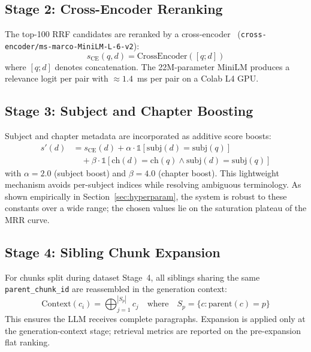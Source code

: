 \documentclass[conference]{IEEEtran}
\begin{document}
\subsection{Stage 2: Cross-Encoder Reranking}
The top-100 RRF candidates are reranked by a cross-encoder~\cite{nogueira2019bert} (\texttt{cross-encoder/ms-marco-MiniLM-L-6-v2}):
\begin{equation}
\label{eq:ce}
s_{\mathrm{CE}}(q,d) = \mathrm{CrossEncoder}([q;d])
\end{equation}
where $[q;d]$ denotes concatenation. The 22M-parameter MiniLM produces a relevance logit per pair with ${\approx}1.4$~ms per pair on a Colab L4 GPU.

\subsection{Stage 3: Subject and Chapter Boosting}
Subject and chapter metadata are incorporated as additive score boosts:
\begin{equation}
\label{eq:boost}
\begin{split}
s'(d) &= s_{\mathrm{CE}}(d) + \alpha \cdot \mathbb{1}\!\left[\mathrm{subj}(d) = \mathrm{subj}(q)\right] \\
      &\quad + \beta \cdot \mathbb{1}\!\left[\mathrm{ch}(d) = \mathrm{ch}(q) \wedge \mathrm{subj}(d) = \mathrm{subj}(q)\right]
\end{split}
\end{equation}
with $\alpha = 2.0$ (subject boost) and $\beta = 4.0$ (chapter boost). This lightweight mechanism avoids per-subject indices while resolving ambiguous terminology. As shown empirically in Section~\ref{sec:hyperparam}, the system is robust to these constants over a wide range; the chosen values lie on the saturation plateau of the MRR curve.

\subsection{Stage 4: Sibling Chunk Expansion}
For chunks split during dataset Stage~4, all siblings sharing the same \texttt{parent\_chunk\_id} are reassembled in the generation context:
\begin{equation}
\label{eq:sibling}
\mathrm{Context}(c_i) = \bigoplus_{j=1}^{|S_p|} c_j \quad \text{where}\quad S_p = \{c : \mathrm{parent}(c) = p\}
\end{equation}
This ensures the LLM receives complete paragraphs. Expansion is applied only at the generation-context stage; retrieval metrics are reported on the pre-expansion flat ranking.
\end{document}
